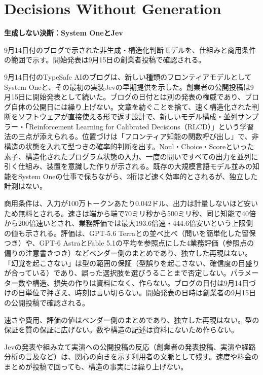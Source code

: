 \section{Decisions Without Generation}
\begin{wideflow}
{\Large\bfseries 生成しない決断：System OneとJev}\par
\smallskip
{\color{SurveyMuted}9月14日付のブログで示された非生成・構造化判断モデルを、仕組みと商用条件の範囲で示す。開始発表は9月15日の創業者投稿で確認される。}\par
\end{wideflow}

9月14日付のTypeSafe AIのブログは、新しい種類のフロンティアモデルとしてSystem Oneと、その最初の実装Jevの早期提供を示した\cite{jev}。創業者の公開投稿は9月15日に開始発表として続いた\cite{w38x-jev-ceo}。ブログの日付とは別の発表の権威であり、ブログ自体の公開日には繰り上げない。文章を紡ぐことを捨て、速く構造化された判断をソフトウェアが直接使える形で返す設計で、新しいモデル構成・並列サンプラー・「Reinforcement Learning for Calibrated Decisions（RLCD）」という学習法の三点が添えられる。位置づけは「フロンティア知能の関数呼び出し」で、非構造の状態を入れて型つきの確率的判断を出す。Noul・Choice・Scoreといった素子、構造化されたプログラム状態の入力、一度の問いですべての出力を並列に引く仕組み、装置を意識した作りが示される。既存の大規模言語モデル並みの知能をSystem Oneの仕事で保ちながら、2桁ほど速く効率的とされるが、独立した計測はない。

商用条件は、入力が100万トークンあたり0.042ドル、出力は計量しないほど安いため無料とされる\cite{jev}。速さは端から端で70ミリ秒から500ミリ秒、同じ知能で40倍から200倍速いとされ、業務評価では最大193.6倍速・444.6倍安いという上限側の値も示される。評価は、GPT-5.6 Terraとの並べ比べ（問いを簡単化した留保つき）や、GPT-6 AstraとFable 5.1の平均を参照点にした4業務評価（参照点の偏りの注意書きつき）などベンダー側のまとめであり、独立した再現はない。「幻覚を起こさない」は型の範囲の保証（型誤りを起こさない、確信度の目盛りが合っている）であり、誤った選択肢を選びうることまで否定しない。パラメーター数や構造、損失の作りは資料になく、作らない。ブログの日付は9月14日づけの日単位で押さえ、時刻は言い切らない。開始発表の日時は創業者の9月15日の公開投稿で確認される\cite{w38x-jev-ceo}。

\begin{claimboundary}[判断モデルの境界]
速さや費用、評価の値はベンダー側のまとめであり、独立した再現はない。型の保証を質の保証に広げない。数や構造の記述は資料にないため作らない。
\end{claimboundary}

\begin{communitynote}
Jevの発表や組み立て実演への公開投稿の反応（創業者の発表投稿、実演や経路分析の言及など）は、関心の向きを示す利用者の文脈として残す\cite{w38x-jev-ceo,w38x-jev-route}。速度や料金のまとめが投稿で回っても、構造の事実には繰り上げない。
\end{communitynote}
